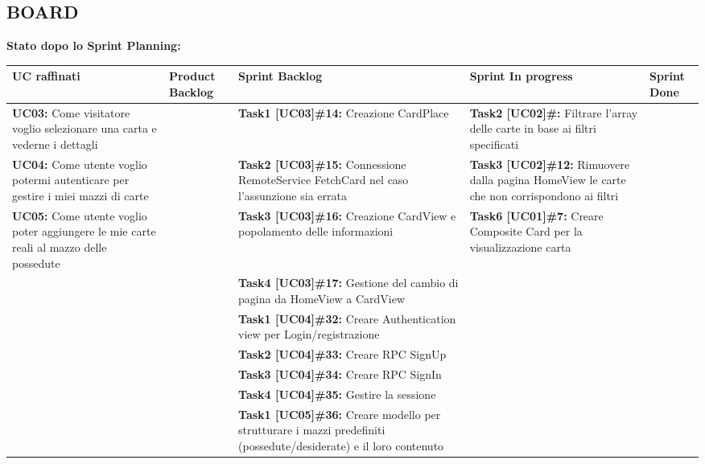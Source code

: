 \documentclass{article}
\begin{document}
    \begin{itemize}
        \newpage
        \subsection{BOARD}
        \textbf{Stato dopo lo Sprint Planning:}
        \newline
        \newline
        \begin{tabular}{ | p{3.5cm} | p{1.5cm} | p{5cm} | p{1.6cm} | p{1.6cm} | }
            \hline
            \textbf{UC raffinati}
            & \textbf{Product Backlog}
            & \textbf{Sprint Backlog}
            & \textbf{Sprint In progress}
            & \textbf{Sprint Done} \\
            \hline
            \textbf{UC03:}  Come visitatore voglio selezionare una carta e vederne i dettagli
            & & \textbf{Task1 [UC03]\#14:} Creazione CardPlace & \textbf{Task2 [UC02]#\11:} Filtrare l'array delle carte in base ai filtri specificati   & \\
            \hline
            \textbf{UC04:}  Come utente voglio potermi autenticare per gestire i miei mazzi di carte
            &  & \textbf{Task2 [UC03]\#15:} Connessione RemoteService FetchCard nel caso l'assunzione sia errata &  \textbf{Task3 [UC02]\#12:} Rimuovere dalla pagina HomeView le carte che non corrispondono ai filtri & \\
            \hline
            \textbf{UC05:}  Come utente voglio poter aggiungere le mie carte reali al mazzo delle possedute
            &  & \textbf{Task3 [UC03]\#16:} Creazione CardView e popolamento delle informazioni  & \textbf{Task6 [UC01]\#7:}  Creare Composite Card per la visualizzazione carta &\\
            \hline
            & & \textbf{Task4 [UC03]\#17:} Gestione del cambio di pagina da HomeView a CardView & & \\
            \hline
            & & \textbf{Task1 [UC04]\#32:} Creare Authentication view per Login/registrazione  & & \\
            \hline
            & & \textbf{Task2 [UC04]\#33:} Creare RPC SignUp & & \\
            \hline
            & & \textbf{Task3 [UC04]\#34:} Creare RPC SignIn  & & \\
            \hline
            & & \textbf{Task4 [UC04]\#35:} Gestire la sessione  & & \\
            \hline
            & & \textbf{Task1 [UC05]\#36:} Creare modello per strutturare i mazzi predefiniti (possedute/desiderate) e il loro contenuto  & & \\

\end{tabular}
\end{itemize}
\end{document}
